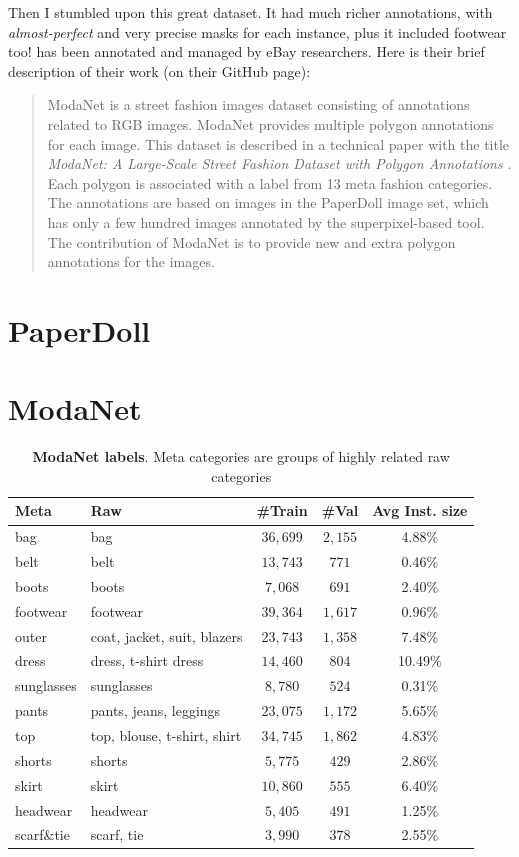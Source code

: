 Then I stumbled upon this great dataset. It had much richer annotations, with \emph{almost-perfect} and very precise masks for each instance, plus it included footwear too!
\modanet has been annotated and managed by eBay researchers.
Here is their brief description of their work (on their GitHub page):
\begin{quotation}
	ModaNet is a street fashion images dataset consisting of annotations related to RGB images. ModaNet provides multiple polygon annotations for each image. This dataset is described in a technical paper with the title \emph{ModaNet: A Large-Scale Street Fashion Dataset with Polygon Annotations} \cite{zheng/2018acmmm}. Each polygon is associated with a label from 13 meta fashion categories. The annotations are based on images in the PaperDoll image set, which has only a few hundred images annotated by the superpixel-based tool. The contribution of ModaNet is to provide new and extra polygon annotations for the images.
\end{quotation}


\section{PaperDoll}\label{s:ds-paperdoll}

\section{ModaNet}\label{s:ds-modanet}

\begin{table}[H]
\centering
\small
\caption{\textbf{ModaNet labels}. Meta categories are groups of highly related raw categories}
\label{tab:modanet statistics}
\begin{tabularx}{\linewidth}{@{}lXccc@{}}
\hline
Meta & Raw & \#Train & \#Val & Avg Inst. size\\
\hline
bag  & bag & $36,699$  & $2,155$  & 4.88\% \\
belt  & belt & $13,743$ & $771$ & 0.46\% \\
boots  & boots & $7,068$ & $691$ & 2.40\%  \\
footwear  & footwear & $39,364$ & $1,617$ & 0.96\% \\
outer  & coat, jacket, suit, blazers
& $23,743$ & $1,358$ & 7.48\% \\
dress  & dress, t-shirt dress & $14,460$ & $804$ & 10.49\% \\
sunglasses  & sunglasses &  $8,780$ & $524$ & 0.31\% \\
pants  & pants, jeans, leggings & $23,075$  &  $1,172$ & 5.65\% \\
top  & top, blouse, t-shirt, shirt & $34,745$ & $1,862$ & 4.83\% \\ 
shorts  & shorts & $5,775$ & $429$ & 2.86\% \\ 
skirt  & skirt & $10,860$  & $555$ &  6.40\% \\ 
headwear  & headwear & $5,405$ & $491$ & 1.25\% \\ 
scarf\&tie  & scarf, tie & $3,990$ & $378$ & 2.55\%  \\ 
\hline
\end{tabularx}
\end{table}

